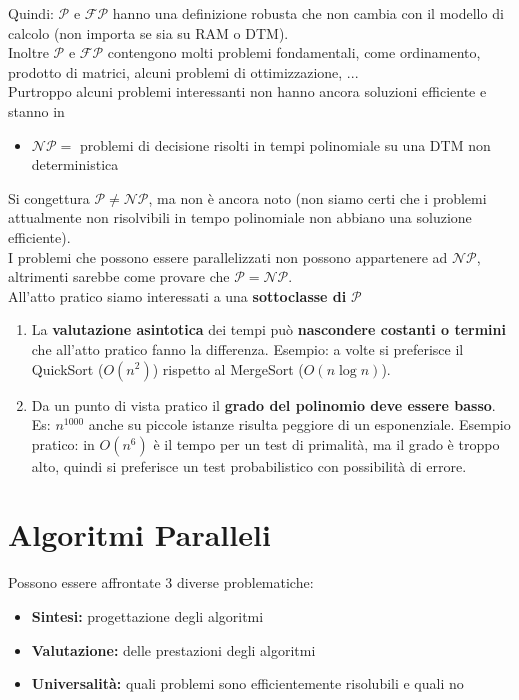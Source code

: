 \documentclass[11pt]{article}
\begin{document}
	Quindi: $\mathcal{P}$ e $\mathcal{FP}$ hanno una definizione robusta che non cambia con il modello di calcolo (non importa se sia su RAM o DTM).\\
	Inoltre $\mathcal{P}$ e $\mathcal{FP}$ contengono molti problemi fondamentali, come ordinamento, prodotto di matrici, alcuni problemi di ottimizzazione, ...  \\
	
	Purtroppo alcuni problemi interessanti non hanno ancora soluzioni efficiente e stanno in 
	\begin{itemize}
		\item $\mathcal{NP} =$ problemi di decisione risolti in tempi polinomiale su una DTM non deterministica
	\end{itemize}
	Si congettura $\mathcal{P} \neq \mathcal{NP}$, ma non è ancora noto (non siamo certi che i problemi attualmente non risolvibili in tempo polinomiale non abbiano una soluzione efficiente).\\
	
	I problemi che possono essere parallelizzati non possono appartenere ad $\mathcal{NP}$, altrimenti sarebbe come provare che $\mathcal{P} = \mathcal{NP}$.\\
	
	All'atto pratico siamo interessati a una \textbf{sottoclasse di} $\mathcal{P}$
	\begin{enumerate}
		\item La \textbf{valutazione asintotica} dei tempi può \textbf{nascondere costanti o termini} che all'atto pratico fanno la differenza. Esempio: a volte si preferisce il QuickSort ($O(n^2)$) rispetto al MergeSort ($O(n \log n)$).
		\item Da un punto di vista pratico il \textbf{grado del polinomio deve essere basso}. Es: $n^{1000}$ anche su piccole istanze risulta peggiore di un esponenziale. Esempio pratico: in $O(n^6)$ è il tempo per un test di primalità, ma il grado è troppo alto, quindi si preferisce un test probabilistico con possibilità di errore.
	\end{enumerate}
	
	\newpage
	
	\section{Algoritmi Paralleli}
	
	Possono essere affrontate 3 diverse problematiche:
	\begin{itemize}
		\item \textbf{Sintesi:} progettazione degli algoritmi 
		\item \textbf{Valutazione:} delle prestazioni degli algoritmi
		\item \textbf{Universalità:} quali problemi sono efficientemente risolubili e quali no
	\end{itemize}
	
\end{document}
